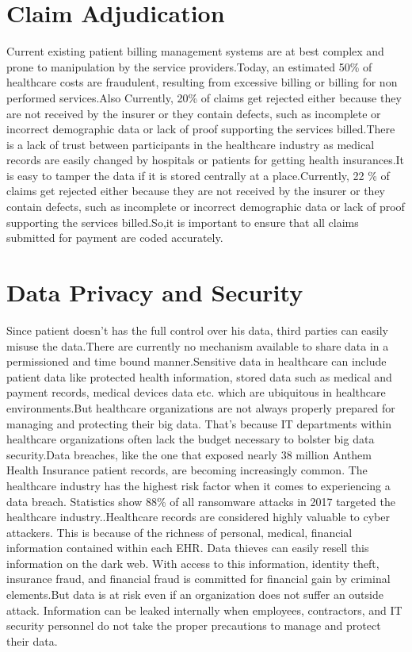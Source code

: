 \documentclass[12pt]{report}
\begin{document}
\section{Claim Adjudication}
Current existing patient billing management systems are at best complex and prone to manipulation by the service providers.Today, an estimated 50\% of healthcare costs are fraudulent, resulting from excessive
billing or billing for non performed services.Also Currently, 20\% of claims get rejected either because they are not received by the insurer or they contain defects, such as incomplete or incorrect demographic
data or lack of proof supporting the services billed\cite{7}.There is a lack of trust between participants in the healthcare industry as medical records are easily changed by hospitals or patients for getting health insurances.It is easy to tamper the data if it is stored centrally at a place.Currently, 22 \% of claims get rejected either because they are not received by the insurer or they contain defects, such as incomplete or incorrect demographic
data or lack of proof supporting the services billed.So,it is important to ensure that all
claims submitted for payment are coded accurately.
\section{Data Privacy and Security}
Since patient doesn't has the full control over his data, third parties can easily misuse the data.There are currently no mechanism available to share data in a permissioned and time bound manner.Sensitive data in healthcare can include patient data like protected health information, stored data such as medical and payment records, medical devices data etc. which are ubiquitous in healthcare environments.But healthcare organizations are not always properly prepared for managing and protecting their big data. That’s because IT departments within healthcare organizations often lack the budget necessary to bolster big data security.Data breaches, like the one that exposed nearly 38 million Anthem Health Insurance patient records, are becoming increasingly common. The healthcare industry has the highest risk factor when it comes to experiencing a data breach. Statistics show 88\% of all ransomware attacks in 2017 targeted the healthcare industry.\cite{12}.Healthcare records are considered highly valuable to cyber attackers. This is because of the richness of personal, medical, financial information contained within each EHR. Data thieves can easily resell this information on the dark web. With access to this information, identity theft, insurance fraud, and financial fraud is committed for financial gain by criminal elements.But data is at risk even if an organization does not suffer an outside attack. Information can be leaked internally when employees, contractors, and IT security personnel do not take the proper precautions to manage and protect their data.
\end{document}
